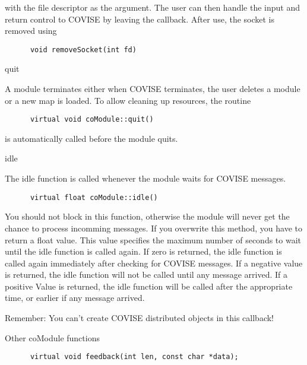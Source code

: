 with the file descriptor as the argument. The user can then handle the input and return 
control to COVISE by leaving the callback. After use, the socket is removed using

\begin{verbatim}
      void removeSocket(int fd)
\end{verbatim}

\vspace*{1cm}
{\Large quit}
\vspace*{0.5cm}

A module terminates either when COVISE terminates, the user deletes a module or a new 
map is loaded. To allow cleaning up resources, the routine

\begin{verbatim}
      virtual void coModule::quit()
\end{verbatim}

is automatically called before the module quits.

\vspace*{1cm}
{\Large idle}
\vspace*{0.5cm}

The idle function is called whenever the module waits for COVISE messages.

\begin{verbatim}
      virtual float coModule::idle()
\end{verbatim}

You should not block in this function, otherwise the module will never get the chance to
process incomming messages. If you overwrite this method, you have to return a float 
value. This value specifies the maximum number of seconds to wait until the idle function
is called again. If zero is returned, the idle function is called again immediately after
checking for COVISE messages. If a negative value is returned, the idle function will 
not be called until any message arrived. If  a positive Value is returned, the idle 
function will be called after the appropriate time, or earlier if any message arrived.

Remember: You can't create COVISE distributed objects in this callback! 

\vspace*{1cm}
{\Large Other coModule functions}
\vspace*{0.5cm}

\begin{verbatim}
      virtual void feedback(int len, const char *data);
\end{verbatim}


